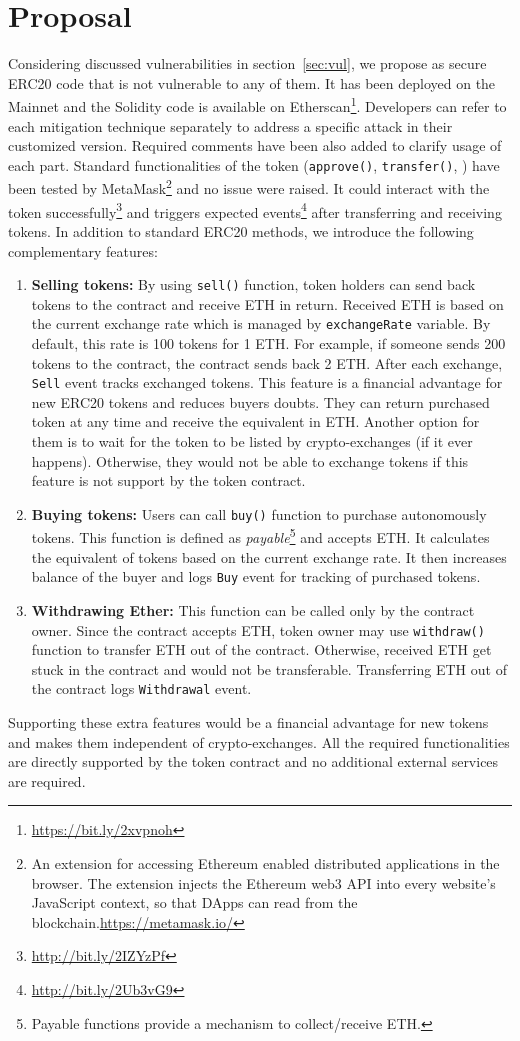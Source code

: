
\section{Proposal}\label{sec:proposal}
Considering discussed vulnerabilities in section~\ref{sec:vul}, we propose as secure ERC20 code that is not vulnerable to any of them. It has been deployed on the Mainnet and the Solidity code is available on Etherscan\footnote{\url{https://bit.ly/2xvpnoh}}. Developers can refer to each mitigation technique separately to address a specific attack in their customized version. Required comments have been also added to clarify usage of each part. Standard functionalities of the token (\ie \texttt{approve()}, \texttt{transfer()}, \etc) have been tested by MetaMask\footnote{An extension for accessing Ethereum enabled distributed applications in the browser. The extension injects the Ethereum web3 API into every website's JavaScript context, so that DApps can read from the blockchain.\url{https://metamask.io/}} and no issue were raised. It could interact with the token successfully\footnote{\url{http://bit.ly/2IZYzPf}} and triggers expected events\footnote{\url{http://bit.ly/2Ub3vG9}} after transferring and receiving tokens. In addition to standard ERC20 methods, we introduce the following complementary features:

\begin{enumerate}
	\item \textbf{Selling tokens:} By using \texttt{sell()} function, token holders can send back tokens to the contract and receive ETH in return. Received ETH is based on the current exchange rate which is managed by \texttt{exchangeRate} variable. By default, this rate is 100 tokens for 1 ETH. For example, if someone sends 200 tokens to the contract, the contract sends back 2 ETH. After each exchange, \texttt{Sell} event tracks exchanged tokens. This feature is a financial advantage for new ERC20 tokens and reduces buyers doubts. They can return purchased token at any time and receive the equivalent in ETH. Another option for them is to wait for the token to be listed by crypto-exchanges (if it ever happens). Otherwise, they would not be able to exchange tokens if this feature is not support by the token contract.
	\item \textbf{Buying tokens:} Users can call \texttt{buy()} function to purchase autonomously tokens. This function is defined as \textit{payable}\footnote{Payable functions provide a mechanism to collect/receive ETH.} and accepts ETH. It calculates the equivalent of tokens based on the current exchange rate. It then increases balance of the buyer and logs \texttt{Buy} event for tracking of purchased tokens.
	\item \textbf{Withdrawing Ether:} This function can be called only by the contract owner. Since the contract accepts ETH, token owner may use \texttt{withdraw()} function to transfer ETH out of the contract. Otherwise, received ETH get stuck in the contract and would not be transferable. Transferring ETH out of the contract logs \texttt{Withdrawal} event.
\end{enumerate}

\noindent Supporting these extra features would be a financial advantage for new tokens and makes them independent of crypto-exchanges. All the required functionalities are directly supported by the token contract and no additional external services are required.